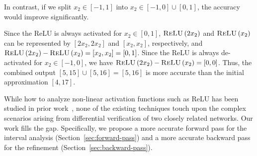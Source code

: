 In contrast, if we split $x_2\in[-1,1]$ into $x_2\in[-1,0] \cup
[0,1]$, the accuracy would improve significantly.
%

%
Since the ReLU is always activated for $x_2\in[0,1]$,
$\textsc{ReLU}\left(2x_2\right)$ and $\textsc{ReLU}\left(x_2\right)$ can be represented by
$[2x_2,2x_2]$ and $[x_2,x_2]$, respectively, and $\textsc{ReLU}\left(2x_2\right)
- \textsc{ReLU}\left(x_2\right) = [x_2,x_2] = [0,1]$.
%
Since the ReLU is always de-activated for $x_2\in[-1,0]$, we have
$\textsc{ReLU}\left(2x_2\right) - \textsc{ReLU}\left(x_2\right) = [0,0]$.
%
Thus, the combined output $[5,15]\cup[5,16] = [5,16]$ is more accurate
than the initial approximation $[4,17]$.



While how to analyze non-linear activation functions such as ReLU has
been studied in prior work~\cite{WangPWYJ18nips, SinghGPV19, KatzHIJLLSTWZDK19}, none of the existing techniques touch
upon the complex scenarios arising from differential verification of
two closely related networks. Our work fills the gap.  Specifically,
we propose a more accurate forward pass for the interval analysis
(Section~\ref{sec:forward-pass}) and a more accurate backward pass for
the refinement (Section~\ref{sec:backward-pass}).

